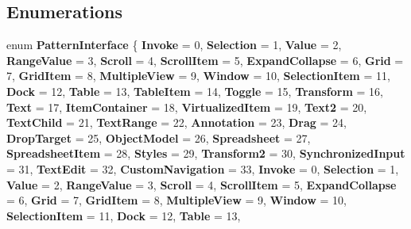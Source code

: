 \subsection*{Enumerations}
\begin{DoxyCompactItemize}
\item 
\mbox{\label{namespace_windows_1_1_u_i_1_1_xaml_1_1_automation_1_1_peers_a4cd1632dc1195eae46e115d12298a6a7}} 
enum {\bfseries Pattern\+Interface} \{ \newline
{\bfseries Invoke} = 0, 
{\bfseries Selection} = 1, 
{\bfseries Value} = 2, 
{\bfseries Range\+Value} = 3, 
\newline
{\bfseries Scroll} = 4, 
{\bfseries Scroll\+Item} = 5, 
{\bfseries Expand\+Collapse} = 6, 
{\bfseries Grid} = 7, 
\newline
{\bfseries Grid\+Item} = 8, 
{\bfseries Multiple\+View} = 9, 
{\bfseries Window} = 10, 
{\bfseries Selection\+Item} = 11, 
\newline
{\bfseries Dock} = 12, 
{\bfseries Table} = 13, 
{\bfseries Table\+Item} = 14, 
{\bfseries Toggle} = 15, 
\newline
{\bfseries Transform} = 16, 
{\bfseries Text} = 17, 
{\bfseries Item\+Container} = 18, 
{\bfseries Virtualized\+Item} = 19, 
\newline
{\bfseries Text2} = 20, 
{\bfseries Text\+Child} = 21, 
{\bfseries Text\+Range} = 22, 
{\bfseries Annotation} = 23, 
\newline
{\bfseries Drag} = 24, 
{\bfseries Drop\+Target} = 25, 
{\bfseries Object\+Model} = 26, 
{\bfseries Spreadsheet} = 27, 
\newline
{\bfseries Spreadsheet\+Item} = 28, 
{\bfseries Styles} = 29, 
{\bfseries Transform2} = 30, 
{\bfseries Synchronized\+Input} = 31, 
\newline
{\bfseries Text\+Edit} = 32, 
{\bfseries Custom\+Navigation} = 33, 
{\bfseries Invoke} = 0, 
{\bfseries Selection} = 1, 
\newline
{\bfseries Value} = 2, 
{\bfseries Range\+Value} = 3, 
{\bfseries Scroll} = 4, 
{\bfseries Scroll\+Item} = 5, 
\newline
{\bfseries Expand\+Collapse} = 6, 
{\bfseries Grid} = 7, 
{\bfseries Grid\+Item} = 8, 
{\bfseries Multiple\+View} = 9, 
\newline
{\bfseries Window} = 10, 
{\bfseries Selection\+Item} = 11, 
{\bfseries Dock} = 12, 
{\bfseries Table} = 13, 
\newline

\end{DoxyCompactItemize}
